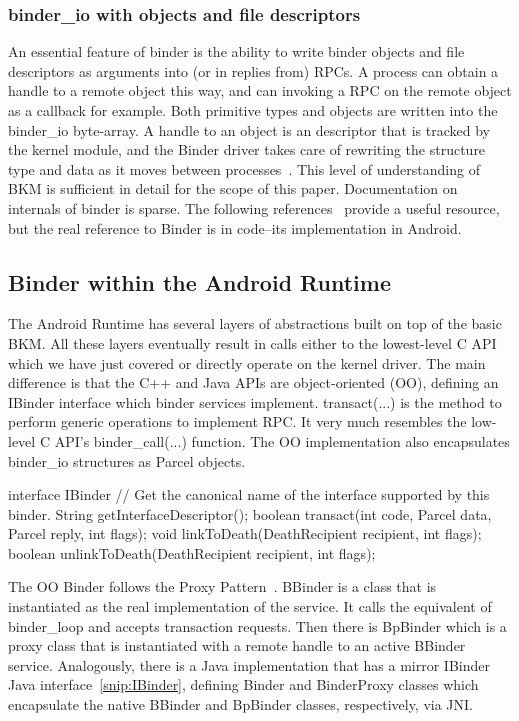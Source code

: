 \documentclass[prodmode]{acmlarge}
\begin{document}
\subsubsection{binder\_io with objects and file descriptors}
An essential feature of binder is the ability to write binder objects and file descriptors as arguments into (or in replies from) RPCs. A process can obtain a handle to a remote object this way, and can invoking a RPC on the remote object as a callback for example. Both primitive types and objects are written into the binder\_io byte-array. A handle to an object is an descriptor that is tracked by the kernel module, and the Binder driver takes care of rewriting the structure type and data as it moves between processes~\cite{BinderSourceComment}. This level of understanding of BKM is sufficient in detail for the scope of this paper. Documentation on internals of binder is sparse. The following references~\cite{BinderLinuxFoundation,BinderMastersThesis} provide a useful resource, but the real reference to Binder is in code--its implementation in Android.

\subsection{Binder within the Android Runtime}
The Android Runtime has several layers of abstractions built on top of the basic BKM. All these layers eventually result in calls either to the lowest-level C API which we have just covered or directly operate on the kernel driver. The main difference is that the C++ and Java APIs are object-oriented (OO), defining an IBinder interface which binder services implement. transact(...) is the method to perform generic operations to implement RPC. It very much resembles the low-level C API's binder\_call(...) function. The OO implementation also encapsulates binder\_io structures as Parcel objects.

\begin{snippet}[label=snip:IBinder]
interface IBinder {
  // Get the canonical name of the interface supported by this binder.
  String getInterfaceDescriptor();
  boolean transact(int code, Parcel data, Parcel reply, int flags);
  void linkToDeath(DeathRecipient recipient, int flags);
  boolean unlinkToDeath(DeathRecipient recipient, int flags);
}
\end{snippet}

The OO Binder follows the Proxy Pattern~\cite{ProxyPattern}. BBinder is a class that is instantiated as the real implementation of the service. It calls the equivalent of binder\_loop and accepts transaction requests. Then there is BpBinder which is a proxy class that is instantiated with a remote handle to an active BBinder service. Analogously, there is a Java implementation that has a mirror IBinder Java interface~\ref{snip:IBinder}, defining Binder and BinderProxy classes which encapsulate the native BBinder and BpBinder classes, respectively, via JNI.
\end{document}

